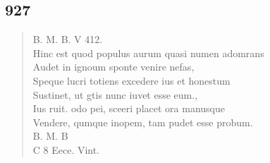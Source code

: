 \documentclass[11pt, a4paper]{report}
\begin{document}
            \subsection*{927}
      \begin{verse}
      B. M. B. V 412. \\ Hinc est quod populus aurum quasi numen adomrans \\ Audet in ignoum sponte venire nefas, \\ Speque lucri totiens excedere ius et honestum \\ Sustinet, ut gtis nunc iuvet esse eum., \\ Ius ruit. odo pei, sceeri placet ora manusque \\ Vendere, qumque inopem, tam pudet esse probum. \\ B. M. B \\ C 8 Eece. Vint. \\ 
      \end{verse}
  
\end{document}
